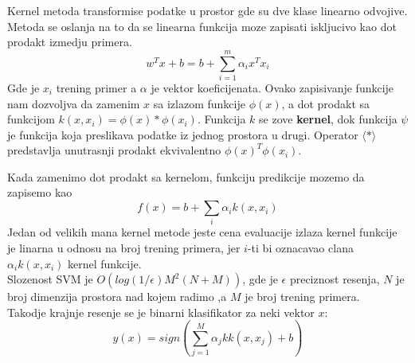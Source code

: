 \documentclass[12pt, letterpaper, oneside]{article}
\begin{document}
Kernel metoda transformise podatke u prostor gde su dve klase linearno odvojive. Metoda se oslanja na to da se linearna funkcija
moze zapisati iskljucivo kao dot prodakt izmedju primera.
\[
    w^{T}x + b = b + \sum_{i=1}^m \alpha_ix^Tx_i
\]
Gde je $x_i$ trening primer a $\alpha$ je vektor koeficijenata. Ovako zapisivanje funkcije nam dozvoljva da zamenim $x$ sa izlazom funkcije $\phi(x)$, a dot prodakt sa funkcijom $k(x,x_i) = \phi(x)*\phi(x_i)$.
Funkcija $k$ se zove \textbf{kernel}, dok funkcija $\psi$ je funkcija koja preslikava podatke iz jednog prostora u drugi. Operator $\langle * \rangle$ predstavlja unutrasnji prodakt ekvivalentno $\phi(x)^T\phi(x_i)$. \cite{goodfellow2016deep}

Kada zamenimo dot prodakt sa kernelom, funkciju predikcije mozemo da zapisemo kao
\[
    f(x) = b + \sum_i \alpha_{i}k(x,x_i)
\]
Jedan od velikih mana kernel metode jeste cena evaluacije izlaza kernel funkcije je linarna u odnosu na broj trening primera, jer $i$-ti bi oznacavao clana $\alpha_ik(x,x_i)$ kernel funkcije. \cite{goodfellow2016deep} \\
Slozenost SVM je $O(log(1/\epsilon)M^2(N+M))$, gde je $\epsilon$ preciznost resenja, $N$ je broj dimenzija prostora nad kojem radimo ,a $M$ je broj trening primera. \\
Takodje krajnje resenje se je binarni klasifikator za neki vektor $x$:
\[
    y(x) = sign(\sum_{j=1}^{M}\alpha_jkk(x,x_j) + b)
\]
\end{document}
